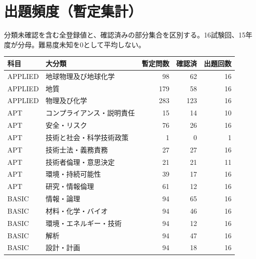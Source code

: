 \chapter{出題頻度（暫定集計）}
分類未確認を含む全登録値と、確認済みの部分集合を区別する。16試験回、15年度が分母。難易度未知を0として平均しない。
\begin{longtable}{p{.16\linewidth}p{.42\linewidth}rrr}
科目 & 大分類 & 暫定問数 & 確認済 & 出題回数\\\hline
APPLIED & 地球物理及び地球化学 & 98 & 62 & 16\\
APPLIED & 地質 & 179 & 58 & 16\\
APPLIED & 物理及び化学 & 283 & 123 & 16\\
APT & コンプライアンス・説明責任 & 15 & 14 & 10\\
APT & 安全・リスク & 76 & 26 & 16\\
APT & 技術と社会・科学技術政策 & 1 & 0 & 1\\
APT & 技術士法・義務責務 & 27 & 27 & 16\\
APT & 技術者倫理・意思決定 & 21 & 21 & 11\\
APT & 環境・持続可能性 & 39 & 17 & 16\\
APT & 研究・情報倫理 & 61 & 12 & 16\\
BASIC & 情報・論理 & 94 & 65 & 16\\
BASIC & 材料・化学・バイオ & 94 & 46 & 16\\
BASIC & 環境・エネルギー・技術 & 94 & 12 & 16\\
BASIC & 解析 & 94 & 47 & 16\\
BASIC & 設計・計画 & 94 & 18 & 16\\
\end{longtable}
